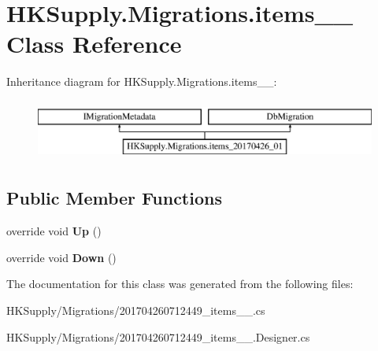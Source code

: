 \hypertarget{class_h_k_supply_1_1_migrations_1_1items__20170426__01}{}\section{H\+K\+Supply.\+Migrations.\+items\+\_\+\_ Class Reference}
\label{class_h_k_supply_1_1_migrations_1_1items__20170426__01}
Inheritance diagram for H\+K\+Supply.\+Migrations.\+items\+\_\+\_\+:\begin{figure}[H]
\begin{center}
\leavevmode
\includegraphics[height=2.000000cm]{class_h_k_supply_1_1_migrations_1_1items__20170426__01}
\end{center}
\end{figure}
\subsection*{Public Member Functions}
\begin{DoxyCompactItemize}
\item 
\mbox{\label{class_h_k_supply_1_1_migrations_1_1items__20170426__01_ae39bcffabd21ddf8be9c0b3ee0bbd9f7}} 
override void {\bfseries Up} ()
\item 
\mbox{\label{class_h_k_supply_1_1_migrations_1_1items__20170426__01_a00e6d12a8c3046d57c1a8f5e3cf72c12}} 
override void {\bfseries Down} ()
\end{DoxyCompactItemize}


The documentation for this class was generated from the following files\+:\begin{DoxyCompactItemize}
\item 
H\+K\+Supply/\+Migrations/201704260712449\+\_\+items\+\_\+\_.\+cs\item 
H\+K\+Supply/\+Migrations/201704260712449\+\_\+items\+\_\+\_.\+Designer.\+cs\end{DoxyCompactItemize}
